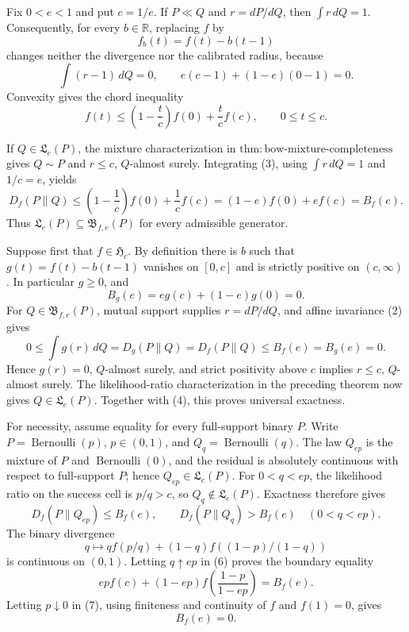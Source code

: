 Fix \(0<e<1\) and put \(c=1/e\).  If \(P\ll Q\) and \(r=dP/dQ\), then \(\int r\,dQ=1\).  Consequently, for every \(b\in\mathbb R\), replacing \(f\) by
\[
 f_b(t)=f(t)-b(t-1)
\]
changes neither the divergence nor the calibrated radius, because
\[
 \int(r-1)\,dQ=0,
 \qquad
 e(c-1)+(1-e)(0-1)=0. \tag{2}
\]
Convexity gives the chord inequality
\[
 f(t)\le \left(1-\frac{t}{c}\right)f(0)+\frac{t}{c}f(c),
 \qquad 0\le t\le c. \tag{3}
\]

If \(Q\in\mathfrak L_e(P)\), the mixture characterization in \(\mathrm{thm:bow\text{-}mixture\text{-}completeness}\) gives \(Q\sim P\) and \(r\le c\), \(Q\)-almost surely.  Integrating (3), using \(\int r\,dQ=1\) and \(1/c=e\), yields
\[
 D_f(P\|Q)
 \le \left(1-\frac1c\right)f(0)+\frac1c f(c)
 =(1-e)f(0)+ef(c)=B_f(e). \tag{4}
\]
Thus \(\mathfrak L_e(P)\subseteq\mathfrak B_{f,e}(P)\) for every admissible generator.

Suppose first that \(f\in\mathfrak H_c\).  By definition there is \(b\) such that \(g(t)=f(t)-b(t-1)\) vanishes on \([0,c]\) and is strictly positive on \((c,\infty)\).  In particular \(g\ge0\), and
\[
 B_g(e)=eg(c)+(1-e)g(0)=0. \tag{5}
\]
For \(Q\in\mathfrak B_{f,e}(P)\), mutual support supplies \(r=dP/dQ\), and affine invariance (2) gives
\[
 0\le \int g(r)\,dQ=D_g(P\|Q)=D_f(P\|Q)\le B_f(e)=B_g(e)=0.
\]
Hence \(g(r)=0\), \(Q\)-almost surely, and strict positivity above \(c\) implies \(r\le c\), \(Q\)-almost surely.  The likelihood-ratio characterization in the preceding theorem now gives \(Q\in\mathfrak L_e(P)\).  Together with (4), this proves universal exactness.

For necessity, assume equality for every full-support binary \(P\).  Write \(P=\operatorname{Bernoulli}(p)\), \(p\in(0,1)\), and \(Q_q=\operatorname{Bernoulli}(q)\).  The law \(Q_{ep}\) is the mixture of \(P\) and \(\operatorname{Bernoulli}(0)\), and the residual is absolutely continuous with respect to full-support \(P\); hence \(Q_{ep}\in\mathfrak L_e(P)\).  For \(0<q<ep\), the likelihood ratio on the success cell is \(p/q>c\), so \(Q_q\notin\mathfrak L_e(P)\).  Exactness therefore gives
\[
 D_f(P\|Q_{ep})\le B_f(e),
 \qquad
 D_f(P\|Q_q)>B_f(e)\quad(0<q<ep). \tag{6}
\]
The binary divergence
\[
 q\longmapsto qf(p/q)+(1-q)f((1-p)/(1-q))
\]
is continuous on \((0,1)\).  Letting \(q\uparrow ep\) in (6) proves the boundary equality
\[
 epf(c)+(1-ep)f\!\left(\frac{1-p}{1-ep}\right)=B_f(e). \tag{7}
\]
Letting \(p\downarrow0\) in (7), using finiteness and continuity of \(f\) and \(f(1)=0\), gives
\[
 B_f(e)=0. \tag{8}
\]

